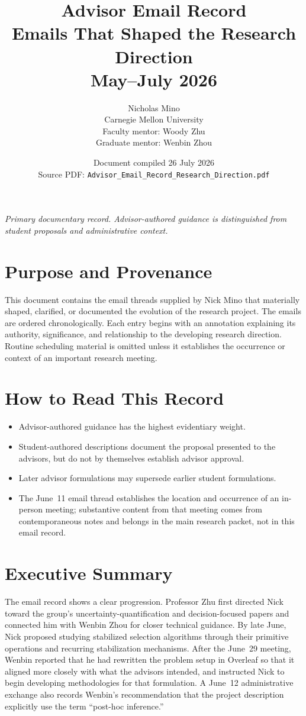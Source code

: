 \documentclass[11pt]{article}
\title{Advisor Email Record\\[0.35em]
\large Emails That Shaped the Research Direction\\[0.15em]
\normalsize May--July 2026}
\author{Nicholas Mino\\
Carnegie Mellon University\\[0.4em]
\small Faculty mentor: Woody Zhu\\
\small Graduate mentor: Wenbin Zhou}
\date{Document compiled 26 July 2026\\
\small Source PDF: \texttt{Advisor\_Email\_Record\_Research\_Direction.pdf}}
\begin{document}
\maketitle

\begin{center}
\textit{Primary documentary record. Advisor-authored guidance is distinguished from
student proposals and administrative context.}
\end{center}

\section*{Purpose and Provenance}
This document contains the email threads supplied by Nick Mino that materially
shaped, clarified, or documented the evolution of the research project. The
emails are ordered chronologically. Each entry begins with an annotation
explaining its authority, significance, and relationship to the developing
research direction. Routine scheduling material is omitted unless it
establishes the occurrence or context of an important research meeting.

\section*{How to Read This Record}
\begin{itemize}[leftmargin=*,itemsep=0.35em]
  \item Advisor-authored guidance has the highest evidentiary weight.
  \item Student-authored descriptions document the proposal presented to the
        advisors, but do not by themselves establish advisor approval.
  \item Later advisor formulations may supersede earlier student formulations.
  \item The June~11 email thread establishes the location and occurrence of an
        in-person meeting; substantive content from that meeting comes from
        contemporaneous notes and belongs in the main research packet, not in
        this email record.
\end{itemize}

\section*{Executive Summary}
The email record shows a clear progression. Professor Zhu first directed Nick
toward the group's uncertainty-quantification and decision-focused papers and
connected him with Wenbin Zhou for closer technical guidance. By late June,
Nick proposed studying stabilized selection algorithms through their primitive
operations and recurring stabilization mechanisms. After the June~29 meeting,
Wenbin reported that he had rewritten the problem setup in Overleaf so that it
aligned more closely with what the advisors intended, and instructed Nick to
begin developing methodologies for that formulation. A June~12 administrative
exchange also records Wenbin's recommendation that the project description
explicitly use the term ``post-hoc inference.''
\end{document}
